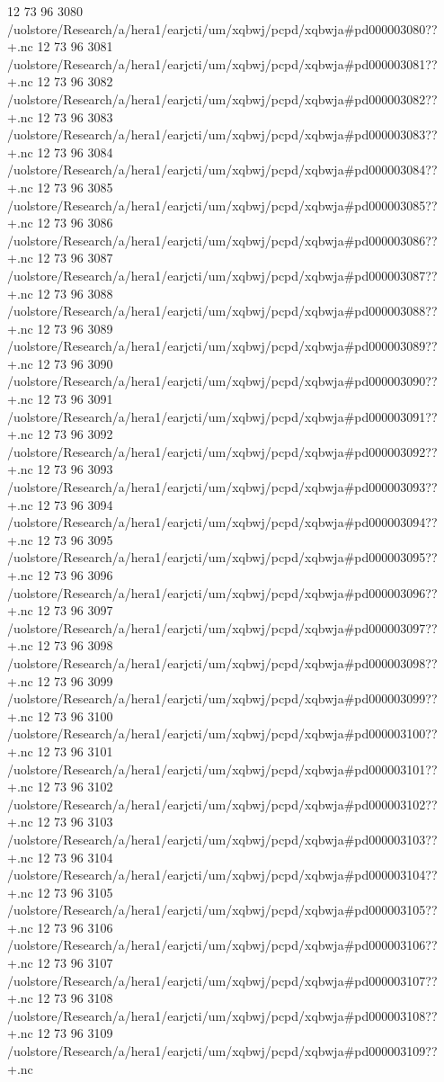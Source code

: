 12 73 96
3080
/uolstore/Research/a/hera1/earjcti/um/xqbwj/pcpd/xqbwja#pd000003080??+.nc
12 73 96
3081
/uolstore/Research/a/hera1/earjcti/um/xqbwj/pcpd/xqbwja#pd000003081??+.nc
12 73 96
3082
/uolstore/Research/a/hera1/earjcti/um/xqbwj/pcpd/xqbwja#pd000003082??+.nc
12 73 96
3083
/uolstore/Research/a/hera1/earjcti/um/xqbwj/pcpd/xqbwja#pd000003083??+.nc
12 73 96
3084
/uolstore/Research/a/hera1/earjcti/um/xqbwj/pcpd/xqbwja#pd000003084??+.nc
12 73 96
3085
/uolstore/Research/a/hera1/earjcti/um/xqbwj/pcpd/xqbwja#pd000003085??+.nc
12 73 96
3086
/uolstore/Research/a/hera1/earjcti/um/xqbwj/pcpd/xqbwja#pd000003086??+.nc
12 73 96
3087
/uolstore/Research/a/hera1/earjcti/um/xqbwj/pcpd/xqbwja#pd000003087??+.nc
12 73 96
3088
/uolstore/Research/a/hera1/earjcti/um/xqbwj/pcpd/xqbwja#pd000003088??+.nc
12 73 96
3089
/uolstore/Research/a/hera1/earjcti/um/xqbwj/pcpd/xqbwja#pd000003089??+.nc
12 73 96
3090
/uolstore/Research/a/hera1/earjcti/um/xqbwj/pcpd/xqbwja#pd000003090??+.nc
12 73 96
3091
/uolstore/Research/a/hera1/earjcti/um/xqbwj/pcpd/xqbwja#pd000003091??+.nc
12 73 96
3092
/uolstore/Research/a/hera1/earjcti/um/xqbwj/pcpd/xqbwja#pd000003092??+.nc
12 73 96
3093
/uolstore/Research/a/hera1/earjcti/um/xqbwj/pcpd/xqbwja#pd000003093??+.nc
12 73 96
3094
/uolstore/Research/a/hera1/earjcti/um/xqbwj/pcpd/xqbwja#pd000003094??+.nc
12 73 96
3095
/uolstore/Research/a/hera1/earjcti/um/xqbwj/pcpd/xqbwja#pd000003095??+.nc
12 73 96
3096
/uolstore/Research/a/hera1/earjcti/um/xqbwj/pcpd/xqbwja#pd000003096??+.nc
12 73 96
3097
/uolstore/Research/a/hera1/earjcti/um/xqbwj/pcpd/xqbwja#pd000003097??+.nc
12 73 96
3098
/uolstore/Research/a/hera1/earjcti/um/xqbwj/pcpd/xqbwja#pd000003098??+.nc
12 73 96
3099
/uolstore/Research/a/hera1/earjcti/um/xqbwj/pcpd/xqbwja#pd000003099??+.nc
12 73 96
3100
/uolstore/Research/a/hera1/earjcti/um/xqbwj/pcpd/xqbwja#pd000003100??+.nc
12 73 96
3101
/uolstore/Research/a/hera1/earjcti/um/xqbwj/pcpd/xqbwja#pd000003101??+.nc
12 73 96
3102
/uolstore/Research/a/hera1/earjcti/um/xqbwj/pcpd/xqbwja#pd000003102??+.nc
12 73 96
3103
/uolstore/Research/a/hera1/earjcti/um/xqbwj/pcpd/xqbwja#pd000003103??+.nc
12 73 96
3104
/uolstore/Research/a/hera1/earjcti/um/xqbwj/pcpd/xqbwja#pd000003104??+.nc
12 73 96
3105
/uolstore/Research/a/hera1/earjcti/um/xqbwj/pcpd/xqbwja#pd000003105??+.nc
12 73 96
3106
/uolstore/Research/a/hera1/earjcti/um/xqbwj/pcpd/xqbwja#pd000003106??+.nc
12 73 96
3107
/uolstore/Research/a/hera1/earjcti/um/xqbwj/pcpd/xqbwja#pd000003107??+.nc
12 73 96
3108
/uolstore/Research/a/hera1/earjcti/um/xqbwj/pcpd/xqbwja#pd000003108??+.nc
12 73 96
3109
/uolstore/Research/a/hera1/earjcti/um/xqbwj/pcpd/xqbwja#pd000003109??+.nc
